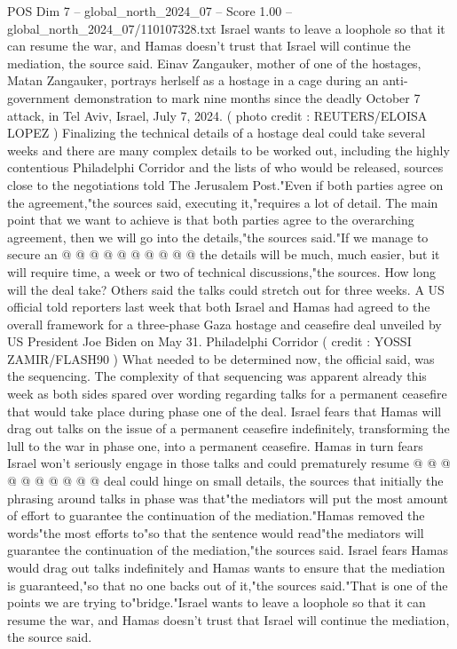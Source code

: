 \begin{textsample}{POS Dim 7 – global\_north\_2024\_07 – Score 1.00 – global\_north\_2024\_07/110107328.txt}  \label{ex:f7_pos_333}
Israel wants to leave a loophole so that it can resume the war, and Hamas doesn't trust that Israel will continue the mediation, the source said.
Einav Zangauker, mother of one of the hostages, Matan Zangauker, portrays herlself as a hostage in a cage during an anti-government demonstration to mark nine months since the deadly October 7 attack, in Tel Aviv, Israel, July 7, 2024. ( photo credit : REUTERS/ELOISA LOPEZ ) Finalizing the technical details of a hostage deal could take several weeks and there are many complex details to be worked out, including the highly contentious Philadelphi Corridor and the lists of who would be released, sources close to the negotiations told The Jerusalem Post."Even if both parties agree on the agreement,"the sources said, executing it,"requires a lot of detail.
The main point that we want to achieve is that both parties agree to the overarching agreement, then we will go into the details,"the sources said."If we manage to secure an @ @ @ @ @ @ @ @ @ @ the details will be much, much easier, but it will require time, a week or two of technical discussions,"the sources.
How long will the deal take?
Others said the talks could stretch out for three weeks.
A US official told reporters last week that both Israel and Hamas had agreed to the overall framework for a three-phase Gaza hostage and ceasefire deal unveiled by US President Joe Biden on May 31.
Philadelphi Corridor ( credit : YOSSI ZAMIR/FLASH90 ) What needed to be determined now, the official said, was the sequencing.
The complexity of that sequencing was apparent already this week as both sides spared over wording regarding talks for a permanent ceasefire that would take place during phase one of the deal.
Israel fears that Hamas will drag out talks on the issue of a permanent ceasefire indefinitely, transforming the lull to the war in phase one, into a permanent ceasefire.
Hamas in turn fears Israel won't seriously engage in those talks and could prematurely resume @ @ @ @ @ @ @ @ @ @ deal could hinge on small details, the sources that initially the phrasing around talks in phase was that"the mediators will put the most amount of effort to guarantee the continuation of the mediation."Hamas removed the words"the most efforts to"so that the sentence would read"the mediators will guarantee the continuation of the mediation,"the sources said.
Israel fears Hamas would drag out talks indefinitely and Hamas wants to ensure that the mediation is guaranteed,"so that no one backs out of it,"the sources said."That is one of the points we are trying to"bridge."Israel wants to leave a loophole so that it can resume the war, and Hamas doesn't trust that Israel will continue the mediation, the source said.

\end{textsample}
